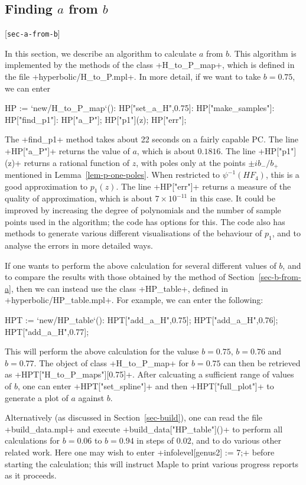 \documentclass[reqno]{amsart}
\newcommand{\lbl}[1]{\label{#1}\textup{[\texttt{#1}]}\par}
\newcommand{\lbl}{\label}
\newcommand{\tm}        {\times}
\renewcommand{\:}{\colon}
\theoremstyle{definition}
\begin{document}
\subsection{Finding \texorpdfstring{$a$}{a} from \texorpdfstring{$b$}{b}}
\lbl{sec-a-from-b}

In this section, we describe an algorithm to calculate $a$ from $b$.
This algorithm is implemented by the methods of the class
\mcode+H_to_P_map+, which is defined in the file
\fname+hyperbolic/H_to_P.mpl+.  In more detail, if we want to
take $b=0.75$, we can enter
\begin{mcodeblock}
   HP := `new/H_to_P_map`():
   HP["set_a_H",0.75]:
   HP["make_samples"]:
   HP["find_p1"]:
   HP["a_P"];
   HP["p1"](z);
   HP["err"];
\end{mcodeblock}
The \mcode+find_p1+ method takes about 22 seconds on a fairly capable
PC.  The line \mcode+HP["a_P"]+ returns the value of $a$, which is
about $0.1816$.  The line \mcode+HP["p1"](z)+ returns a rational
function of $z$, with poles only at the points $\pm ib_-/b_+$
mentioned in Lemma~\ref{lem-p-one-poles}.  When restricted to
$\psi^{-1}(HF_4)$, this is a good approximation to $p_1(z)$.  The line
\mcode+HP["err"]+ returns a measure of the quality of approximation,
which is about $7\tm 10^{-11}$ in this case.  It could be improved by
increasing the degree of polynomials and the number of sample points
used in the algorithm; the code has options for this.  The code also
has methods to generate various different visualisations of the
behaviour of $p_1$, and to analyse the errors in more detailed ways.

If one wants to perform the above calculation for several different
values of $b$, and to compare the results with those obtained by the
method of Section~\ref{sec-b-from-a}, then we can instead use the
class \mcode+HP_table+, defined in \fname+hyperbolic/HP_table.mpl+.
For example, we can enter the following:
\begin{mcodeblock}
   HPT := `new/HP_table`():
   HPT["add_a_H",0.75];
   HPT["add_a_H",0.76];
   HPT["add_a_H",0.77];
\end{mcodeblock}
This will perform the above calculation for the valuse $b=0.75$,
$b=0.76$ and $b=0.77$.  The object of class \mcode+H_to_P_map+ for
$b=0.75$ can then be retrieved as \mcode+HPT["H_to_P_maps"][0.75]+.
After calcuating a sufficient range of values of $b$, one can enter
\mcode+HPT["set_spline"]+ and then \mcode+HPT["full_plot"]+ to
generate a plot of $a$ against $b$.

Alternatively (as discussed in Section~\ref{sec-build}), one can read
the file \fname+build_data.mpl+ and execute
\mcode+build_data["HP_table"]()+ to perform all calculations for
$b=0.06$ to $b=0.94$ in steps of $0.02$, and to do various other
related work.  Here one may wish to enter 
\mcode+infolevel[genus2] := 7;+ before starting the calculation; this
will instruct Maple to print various progress reports as it proceeds.
\end{document}
